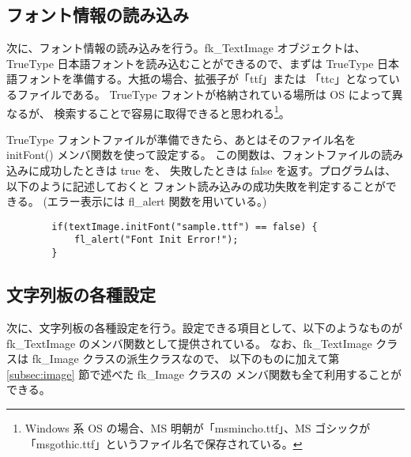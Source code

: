 \subsection{フォント情報の読み込み}
次に、フォント情報の読み込みを行う。fk\_TextImage オブジェクトは、
TrueType 日本語フォントを読み込むことができるので、まずは TrueType
日本語フォントを準備する。大抵の場合、拡張子が「ttf」または
「ttc」となっているファイルである。
TrueType フォントが格納されている場所は OS によって異なるが、
検索することで容易に取得できると思われる\footnote{
Windows 系 OS の場合、MS 明朝が「msmincho.ttf」、MS ゴシックが
「msgothic.ttf」というファイル名で保存されている。}。

TrueType フォントファイルが準備できたら、あとはそのファイル名を
initFont() メンバ関数を使って設定する。
この関数は、フォントファイルの読み込みに成功したときは true を、
失敗したときは false を返す。プログラムは、以下のように記述しておくと
フォント読み込みの成功失敗を判定することができる。
(エラー表示には fl\_alert 関数を用いている。)
\\
\begin{screen}
\begin{verbatim}
        if(textImage.initFont("sample.ttf") == false) {
            fl_alert("Font Init Error!");
        }
\end{verbatim}
\end{screen}

\subsection{文字列板の各種設定}
次に、文字列板の各種設定を行う。設定できる項目として、以下のようなものが
fk\_TextImage のメンバ関数として提供されている。
なお、fk\_TextImage クラスは fk\_Image クラスの派生クラスなので、
以下のものに加えて第 \ref{subsec:image} 節で述べた fk\_Image クラスの
メンバ関数も全て利用することができる。

